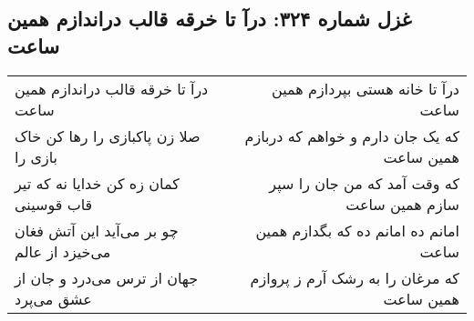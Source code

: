 \begin{center}
\section*{غزل شماره ۳۲۴: درآ تا خرقه قالب دراندازم همین ساعت}
\label{sec:0324}
\begin{longtable}{l p{0.5cm} r}
درآ تا خرقه قالب دراندازم همین ساعت
&&
درآ تا خانه هستی بپردازم همین ساعت
\\
صلا زن پاکبازی را رها کن خاک بازی را
&&
که یک جان دارم و خواهم که دربازم همین ساعت
\\
کمان زه کن خدایا نه که تیر قاب قوسینی
&&
که وقت آمد که من جان را سپر سازم همین ساعت
\\
چو بر می‌آید این آتش فغان می‌خیزد از عالم
&&
امانم ده امانم ده که بگدازم همین ساعت
\\
جهان از ترس می‌درد و جان از عشق می‌پرد
&&
که مرغان را به رشک آرم ز پروازم همین ساعت
\\
\end{longtable}
\end{center}
